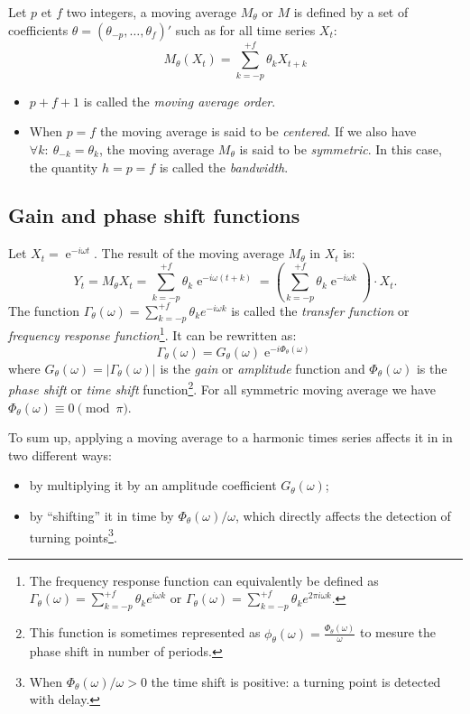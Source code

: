 \documentclass[
  12pt,
  ,
  a4paper]{article}
\DeclareMathOperator{\e}{e}
\newcommand\1{\mathds{1}}
\begin{document}
Let \(p\) et \(f\) two integers, a moving average \(M_\theta\) or \(M\) is defined by a set of coefficients \(\theta=(\theta_{-p},\dots,\theta_{f})'\) such as for all time series \(X_t\):
\[
M_\theta(X_t)=\sum_{k=-p}^{+f}\theta_kX_{t+k}
\]

\begin{itemize}
\item
  \(p+f+1\) is called the \emph{moving average order}.
\item
  When \(p=f\) the moving average is said to be \emph{centered}.
  If we also have \(\forall k:\:\theta_{-k} = \theta_k\), the moving average \(M_\theta\) is said to be \emph{symmetric}.
  In this case, the quantity \(h=p=f\) is called the \emph{bandwidth}.
\end{itemize}

\hypertarget{gain-and-phase-shift-functions}{%
\subsection{Gain and phase shift functions}\label{gain-and-phase-shift-functions}}

Let \(X_t=\e^{-i\omega t}\). The result of the moving average \(M_\theta\) in \(X_t\) is:
\[
Y_t = M_{\theta}X_t = \sum_{k=-p}^{+f} \theta_k \e^{-i \omega (t+k)}
= \left(\sum_{k=-p}^{+f} \theta_k \e^{-i \omega k}\right)\cdot X_t.
\]
The function \(\Gamma_\theta(\omega)=\sum_{k=-p}^{+f} \theta_k e^{-i \omega k}\) is called the \emph{transfer function} or \emph{frequency response function}\footnote{
  The frequency response function can equivalently be defined as \(\Gamma_\theta(\omega)=\sum_{k=-p}^{+f} \theta_k e^{i \omega k}\) or \(\Gamma_\theta(\omega)=\sum_{k=-p}^{+f} \theta_k e^{2\pi i \omega k}\).}.
It can be rewritten as:
\[
\Gamma_\theta(\omega) = G_\theta(\omega)\e^{-i\Phi_\theta(\omega)}
\]
where \(G_\theta(\omega)=\lvert\Gamma_\theta(\omega)\rvert\) is the \emph{gain} or \emph{amplitude} function and \(\Phi_\theta(\omega)\) is the \emph{phase shift} or \emph{time shift} function\footnote{
  This function is sometimes represented as \(\phi_\theta(\omega)=\frac{\Phi_\theta(\omega)}{\omega}\) to mesure the phase shift in number of periods.}.
For all symmetric moving average we have \(\Phi_\theta(\omega)\equiv 0 \pmod{\pi}\).

To sum up, applying a moving average to a harmonic times series affects it in in two different ways:

\begin{itemize}
\item
  by multiplying it by an amplitude coefficient \(G_{\theta}\left(\omega\right)\);
\item
  by ``shifting'' it in time by \(\Phi_\theta(\omega)/\omega\), which directly affects the detection of turning points\footnote{
    When \(\Phi_\theta(\omega)/\omega>0\) the time shift is positive: a turning point is detected with delay.}.
\end{itemize}
\end{document}

